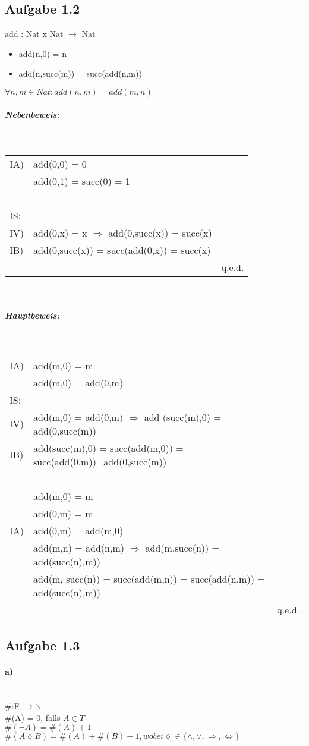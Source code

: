 \documentclass[11pt,a4paper]{article}
\begin{document}
\subsection*{Aufgabe 1.2}
add : Nat x Nat $\rightarrow$ Nat
\begin{itemize}
\item add(n,0) = n
\item add(n,succ(m)) = succ(add(n,m))
\end{itemize}
$\forall n,m \in Nat: add(n,m) = add(m,n)$\\
\subparagraph*{Nebenbeweis:}\ \\
\begin{tabular}{lll}
IA) & add(0,0) = 0\\
& add(0,1) = succ(0) = 1\\
\ \\
IS:\\
IV) & add(0,x) = x $\Rightarrow$ add(0,succ(x)) = succ(x)\\
IB) & add(0,succ(x)) = succ(add(0,x)) = succ(x)\\
&&q.e.d.\\
\end{tabular}\\
\subparagraph*{Hauptbeweis:}\ \\
\begin{tabular}{lll}
IA) & add(m,0) = m\\
	& add(m,0) = add(0,m)\\
IS:\\
IV) & add(m,0) = add(0,m) $\Rightarrow$ add (succ(m),0) = add(0,succ(m))\\
IB) & add(succ(m),0) = succ(add(m,0)) = succ(add(0,m))=add(0,succ(m))\\
\ \\
& add(m,0) = m\\
& add(0,m) = m\\
IA) & add(0,m) = add(m,0)\\
& add(m,n) = add(n,m) $\Rightarrow$ add(m,succ(n)) = add(succ(n),m))\\
& add(m, succ(n)) = succ(add(m,n)) = succ(add(n,m)) = add(succ(n),m))\\
&&q.e.d.\\
\end{tabular}
\subsection*{Aufgabe 1.3}
\paragraph*{a)}\ \\
\#:F $\rightarrow \mathbb{N}$\\
\#(A) = 0, falls $A \in T$\\
$ \# ( \neg A ) = \# (A)+1 $\\
$ \# (A \lozenge B) = \#(A) + \#(B) + 1, wobei \lozenge \in \{ \wedge, \vee, \Rightarrow, \Leftrightarrow \}$
\end{document}
